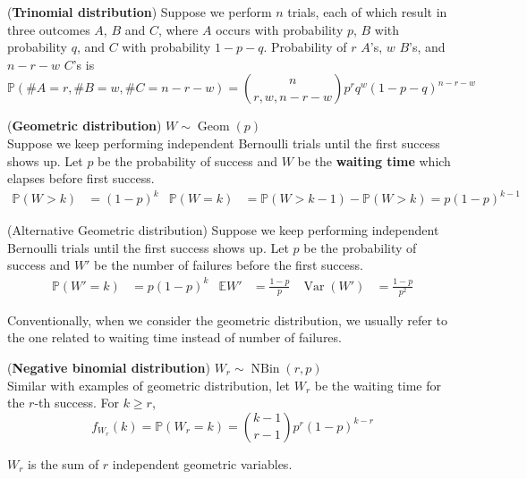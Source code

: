 \documentclass{huhtakm-template-book}
\newcommand{\prob}{\mathbb{P}}
\newcommand{\expect}{\mathbb{E}}
\DeclareMathOperator{\NBin}{NBin}
\DeclareMathOperator{\Geom}{Geom}
\DeclareMathOperator{\Var}{Var}
\begin{document}
\newpage
\begin{eg}(\textbf{Trinomial distribution})
	Suppose we perform $n$ trials, each of which result in three outcomes $A$, $B$ and $C$, where $A$ occurs with probability $p$, $B$ with probability $q$, and $C$ with probability $1-p-q$. Probability of $r$ $A$'s, $w$ $B$'s, and $n-r-w$ $C$'s is
	\begin{equation*}
		\prob(\#A=r, \#B=w, \#C=n-r-w)=\binom{n}{r,w,n-r-w}p^{r}q^{w}(1-p-q)^{n-r-w}
	\end{equation*}
\end{eg}
\begin{eg}(\textbf{Geometric distribution}) $W\sim\Geom(p)$\\
	Suppose we keep performing independent Bernoulli trials until the first success shows up. Let $p$ be the probability of success and $W$ be the \textbf{waiting time} which elapses before first success.
	\begin{align*}
		\prob(W>k)&=(1-p)^{k} & \prob(W=k)&=\prob(W>k-1)-\prob(W>k)=p(1-p)^{k-1}
	\end{align*}
\end{eg}
\begin{eg}(Alternative Geometric distribution)
	Suppose we keep performing independent Bernoulli trials until the first success shows up. Let $p$ be the probability of success and $W'$ be the number of failures before the first success.
	\begin{align*}
		\prob(W'=k)&=p(1-p)^{k} & \expect{W'}&=\frac{1-p}{p} & \Var(W')&=\frac{1-p}{p^{2}}
	\end{align*}
\end{eg}
\begin{rem}
	Conventionally, when we consider the geometric distribution, we usually refer to the one related to waiting time instead of number of failures.
\end{rem}
\begin{eg}(\textbf{Negative binomial distribution}) $W_{r}\sim\NBin(r,p)$\\
	Similar with examples of geometric distribution, let $W_{r}$ be the waiting time for the $r$-th success. For $k\geq r$,
	\begin{equation*}
		f_{W_{r}}(k)=\prob(W_{r}=k)=\binom{k-1}{r-1}p^{r}(1-p)^{k-r}
	\end{equation*}
\end{eg}
\begin{rem}
	$W_{r}$ is the sum of $r$ independent geometric variables. 
\end{rem}
\end{document}
